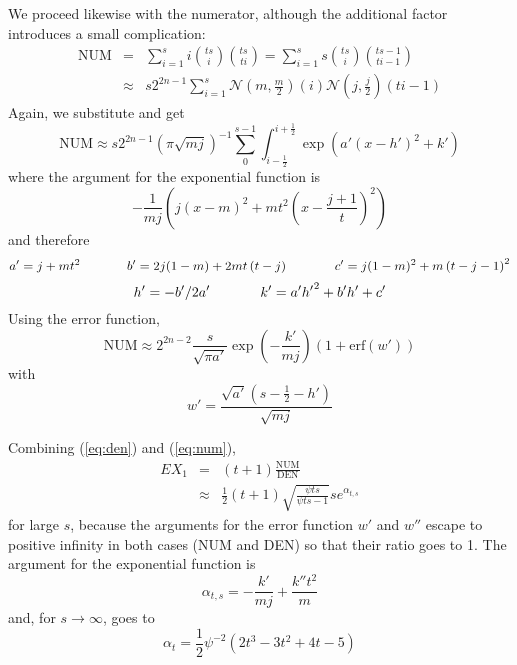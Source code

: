 \documentclass[11pt]{article}
\newcommand{\erf}[0]{\mbox{erf}}
\newcommand{\anum}[0]{a'}
\newcommand{\bnum}[0]{b'}
\newcommand{\cnum}[0]{c'}
\newcommand{\hnum}[0]{h'}
\newcommand{\knum}[0]{k'}
\newcommand{\wnum}[0]{w'}
\newcommand{\kden}[0]{k''}
\begin{document}
We proceed likewise with the numerator, although the additional factor
introduces a small complication:
  \begin{eqnarray*}
  \mbox{NUM}&=&\sum_{i=1}^{s}i\binom{ts}{i}\binom{ts}{ti}=\sum_{i=1}^{s}s\binom{ts}{i}\binom{ts-1}{ti-1}\\
&\approx&s2^{2n-1}\sum_{i=1}^{s}\mathcal{N}\left(m,\frac{m}{2}\right)(i)\mathcal{N}\left(j,\frac{j}{2}\right)(ti-1)
\end{eqnarray*}
Again, we substitute and get
\begin{displaymath}
  \mbox{NUM}\approx{}s2^{2n-1}\left(\pi\sqrt{mj}\right)^{-1}\sum_{0}^{s-1}\int_{i-\frac{1}{2}}^{i+\frac{1}{2}}\exp\left({\anum}(x-{\hnum})^{2}+{\knum}\right)
\end{displaymath}
where the argument for the exponential function is
\begin{displaymath}
  -\frac{1}{mj}\left(j(x-m)^{2}+mt^{2}\left(x-\frac{j+1}{t}\right)^{2}\right)
\end{displaymath}
and therefore
\begin{displaymath}
{\anum}=j+mt^{2}\hspace{.5in}
{\bnum}=2j(1-m)+2mt\left(t-j\right)\hspace{.5in}
{\cnum}=j(1-m)^{2}+m\left(t-j-1\right)^{2}
\end{displaymath}
\begin{displaymath}
{\hnum}=-{\bnum}/2{\anum}\hspace{.5in}
{\knum}={\anum}{\hnum}^{2}+{\bnum}{\hnum}+{\cnum}
\end{displaymath}
Using the error function, 
\begin{equation}
  \label{eq:num}
  \mbox{NUM}\approx{}2^{2n-2}\frac{s}{\sqrt{\pi{}{\anum}}}\exp\left(-\frac{{\knum}}{mj}\right)\left(1+\erf({\wnum})\right)
\end{equation}
with
\begin{displaymath}
  {\wnum}=\frac{\sqrt{{\anum}}\left(s-\frac{1}{2}-{\hnum}\right)}{\sqrt{mj}}
\end{displaymath}

Combining ({\ref{eq:den}}) and ({\ref{eq:num}}),
\begin{eqnarray*}
  EX_{1}&=&(t+1)\frac{\mbox{NUM}}{\mbox{DEN}}\\
&\approx&\frac{1}{2}(t+1)\sqrt{\frac{\psi{}ts}{\psi{}ts-1}}se^{\alpha_{t,s}}
\end{eqnarray*}
for large $s$, because the arguments for the error function $w'$ and
$w''$ escape to positive infinity in both cases (NUM and DEN) so that
their ratio goes to 1. The argument for the exponential function is
\begin{displaymath}
  \alpha_{t,s}=-\frac{{\knum}}{mj}+\frac{{\kden}t^{2}}{m}
\end{displaymath}
and, for $s\rightarrow\infty$, goes to
\begin{displaymath}
  \alpha_{t}=\frac{1}{2}\psi^{-2}(2t^{3}-3t^{2}+4t-5)
\end{displaymath}
\end{document}
